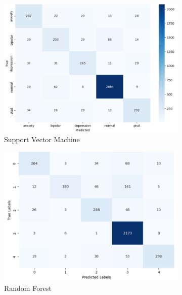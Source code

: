 \begin{figure}[h!]
    \hfill
    \begin{subfigure}[b]{0.49\textwidth}
        \centering
        \includegraphics[width=\textwidth]{Images/SVM Confusion Matrix.png}
        \caption*{Support Vector Machine}
        \label{SVMCM}  %
    \end{subfigure}
    \hfill
    \begin{subfigure}[b]{0.49\textwidth}
        \centering
        \includegraphics[width=\textwidth]{Images/RF Confusion Matrix.png}
        \caption*{Random Forest}
        \label{RFCM}  %
    \end{subfigure}
    \hfill
    \vspace{1cm}
    \begin{subfigure}[b]{0.49\textwidth}

\end{subfigure}
\end{figure}
